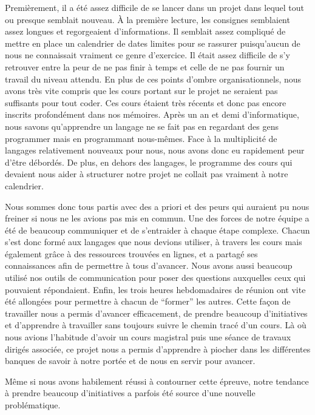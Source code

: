\documentclass[12pt]{report}
\begin{document}
        \bigskip
        \par
        Premièrement, il a été assez difficile de se lancer dans un projet dans lequel tout ou presque semblait nouveau. À la première lecture, les consignes semblaient assez longues et regorgeaient d’informations. Il semblait assez compliqué de mettre en place un calendrier de dates limites pour se rassurer puisqu’aucun de nous ne connaissait vraiment ce genre d’exercice. Il était assez difficile de s’y retrouver entre la peur de ne pas finir à temps et celle de ne pas fournir un travail du niveau attendu. En plus de ces points d’ombre organisationnels, nous avons très vite compris que les cours portant sur le projet ne seraient pas suffisants pour tout coder. Ces cours étaient très récents et donc pas encore inscrits profondément dans nos mémoires. Après un an et demi d’informatique, nous savons qu’apprendre un langage ne se fait pas en regardant des gens programmer mais en programmant nous-mêmes. Face à la multiplicité de langages relativement nouveaux pour nous, nous avons donc eu rapidement peur d’être débordés. De plus, en dehors des langages, le programme des cours qui devaient nous aider à structurer notre projet ne collait pas vraiment à notre calendrier.
        \par
        Nous sommes donc tous partis avec des a priori et des peurs qui auraient pu nous freiner si nous ne les avions pas mis en commun. Une des forces de notre équipe a été de beaucoup communiquer et de s’entraider à chaque étape complexe. Chacun s’est donc formé aux langages que nous devions utiliser, à travers les cours mais également grâce à des ressources trouvées en lignes, et a partagé ses connaissances afin de permettre à tous d’avancer. Nous avons aussi beaucoup utilisé nos outils de communication pour poser des questions auxquelles ceux qui pouvaient répondaient. Enfin, les trois heures hebdomadaires de réunion ont vite été allongées pour permettre à chacun de “former” les autres. Cette façon de travailler nous a permis d’avancer efficacement, de prendre beaucoup d’initiatives et d’apprendre à travailler sans toujours suivre le chemin tracé d’un cours. Là où nous avions l’habitude d’avoir un cours magistral puis une séance de travaux dirigés associée, ce projet nous a permis d’apprendre à piocher dans les différentes banques de savoir à notre portée et de nous en servir pour avancer.
        \par
        Même si nous avons habilement réussi à contourner cette épreuve, notre tendance à prendre beaucoup d’initiatives a parfois été source d’une nouvelle problématique.
        
\end{document}
